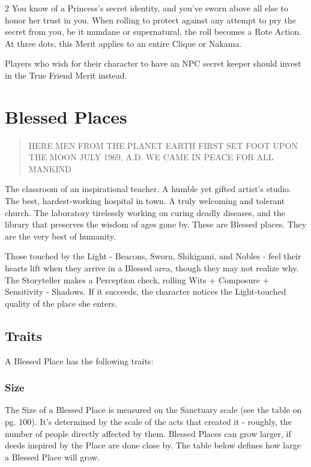 \begin{multicols}{2}
\noindent You know of a Princess's secret identity, and you've sworn above all else to honor her trust in you. When rolling to protect against any attempt to pry the secret from you, be it mundane or supernatural, the roll becomes a Rote Action. At three dots, this Merit applies to an entire Clique or Nakama. 

Players who wish for their character to have an NPC secret keeper should invest in the True Friend Merit instead. 

\section*{Blessed Places}
\label{sec:BlessedPlaces}

\begin{quote}
HERE MEN FROM THE PLANET EARTH FIRST SET FOOT UPON THE MOON
JULY 1969, A.D.
WE CAME IN PEACE FOR ALL MANKIND
 \end{quote}
 
The classroom of an inspirational teacher. A humble yet gifted artist's studio. The best, hardest-working hospital in town. A truly welcoming and tolerant church. The laboratory tirelessly working on curing deadly diseases, and the library that preserves the wisdom of ages gone by. These are Blessed places. They are the very best of humanity.
 
Those touched by the Light - Beacons, Sworn, Shikigami, and Nobles - feel their hearts lift when they arrive in a Blessed area, though they may not realize why. The Storyteller makes a Perception check, rolling Wits + Composure + Sensitivity - Shadows. If it succeeds, the character notices the Light-touched quality of the place she enters.
 
\subsection*{Traits}

A Blessed Place has the following traits:

\subsubsection*{Size}

The Size of a Blessed Place is measured on the Sanctuary scale (see the table on pg. 100). It’s determined by the scale of the acts that created it - roughly, the number of people directly affected by them. Blessed Places can grow larger, if deeds inspired by the Place are done close by. The table below defines how large a Blessed Place will grow. 


\end{multicols}
